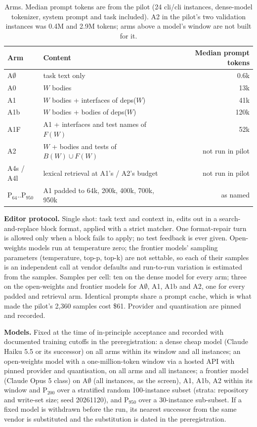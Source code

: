 \documentclass[10pt,conference]{IEEEtran}
\begin{document}
\begin{table}[t]
\centering\small
\begin{tabular}{llr}
\toprule
Arm & Content & Median prompt tokens \\
\midrule
A$\emptyset$ & task text only & 0.6k \\
A0 & $W$ bodies & 13k \\
A1 & $W$ bodies + interfaces of deps($W$) & 41k \\
A1b & $W$ bodies + bodies of deps($W$) & 120k \\
A1F & A1 + interfaces and test names of $F(W)$ & 52k \\
A2 & $W$ + bodies and tests of $B(W) \cup F(W)$ & not run in pilot \\
A4s / A4l & lexical retrieval at A1's / A2's budget & not run in pilot \\
P$_{64}$..P$_{950}$ & A1 padded to 64k, 200k, 400k, 700k, 950k & as named \\
\bottomrule
\end{tabular}
\caption{Arms. Median prompt tokens are from the pilot (24 cli/cli instances, dense-model tokenizer, system prompt and task included). A2 in the pilot's two validation instances was 0.4M and 2.9M tokens; arms above a model's window are not built for it.}
\label{tab:arms}
\end{table}

\textbf{Editor protocol.} Single shot: task text and context in, edits out in a search-and-replace block format, applied with a strict matcher. One format-repair turn is allowed only when a block fails to apply; no test feedback is ever given. Open-weights models run at temperature zero; the frontier models' sampling parameters (temperature, top-p, top-k) are not settable, so each of their samples is an independent call at vendor defaults and run-to-run variation is estimated from the samples. Samples per cell: ten on the dense model for every arm; three on the open-weights and frontier models for A$\emptyset$, A1, A1b and A2, one for every padded and retrieval arm. Identical prompts share a prompt cache, which is what made the pilot's 2,360 samples cost \$61. Provider and quantisation are pinned and recorded.

\textbf{Models.} Fixed at the time of in-principle acceptance and recorded with documented training cutoffs in the preregistration: a dense cheap model (Claude Haiku 5.5 or its successor) on all arms within its window and all instances; an open-weights model with a one-million-token window via a hosted API with pinned provider and quantisation, on all arms and all instances; a frontier model (Claude Opus 5 class) on A$\emptyset$ (all instances, as the screen), A1, A1b, A2 within its window and P$_{200}$ over a stratified random 100-instance subset (strata: repository and write-set size; seed 20261120), and P$_{950}$ over a 30-instance sub-subset. If a fixed model is withdrawn before the run, its nearest successor from the same vendor is substituted and the substitution is dated in the preregistration.
\end{document}
